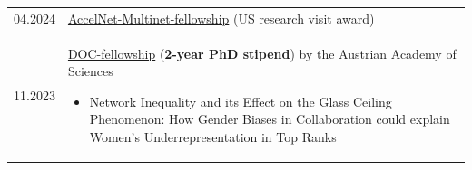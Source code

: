 
\begin{longtable}[l]{@{}p{} p{}}
    04.2024 & \href{https://www.accelnet-multinet.org/}{AccelNet-Multinet-fellowship} (US research visit award)\\
    11.2023 & \href{https://stipendien.oeaw.ac.at/en/fellowships/doc}{DOC-fellowship} (\textbf{2-year PhD stipend}) by the Austrian Academy of Sciences
    \begin{itemize}
        \item \raggedright Network Inequality and its Effect on the Glass Ceiling Phenomenon: How Gender Biases in Collaboration could explain Women's Underrepresentation in Top Ranks
    \end{itemize}

\end{longtable}
